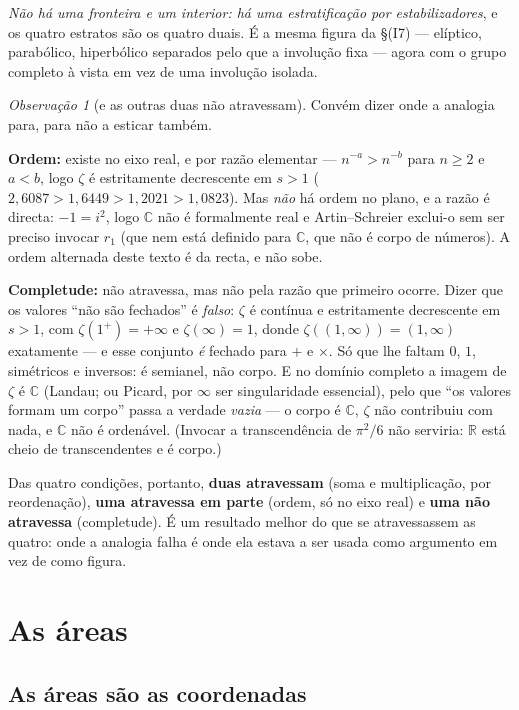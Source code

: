 \documentclass[11pt,a4paper]{article}
\theoremstyle{plain}
\theoremstyle{definition}
\theoremstyle{remark}
\newtheorem{obs}[teorema]{Observação}
\newcommand{\R}{\mathbb{R}}
\newcommand{\C}{\mathbb{C}}
\begin{document}
\noindent \emph{Não há uma fronteira e um interior: há uma estratificação por estabilizadores}, e
os quatro estratos são os quatro duais. É a mesma figura da \S(I7) --- elíptico,
parabólico, hiperbólico separados pelo que a involução fixa --- agora com o grupo completo à vista
em vez de uma involução isolada.

\begin{obs}[e as outras duas não atravessam]\label{obs:naoatravessa}
Convém dizer onde a analogia para, para não a esticar também.

\textbf{Ordem:} existe no eixo real, e por razão elementar --- $n^{-a}>n^{-b}$ para $n\geq2$ e
$a<b$, logo $\zeta$ é estritamente decrescente em $s>1$ ($2{,}6087 > 1{,}6449 > 1{,}2021 >
1{,}0823$). Mas \emph{não} há ordem no plano, e a razão é directa: $-1 = i^2$, logo $\C$ não é formalmente
real e Artin--Schreier exclui-o sem ser preciso invocar $r_1$ (que nem está definido para $\C$, que
não é corpo de números). A ordem alternada deste texto é da recta, e não sobe.

\textbf{Completude:} não atravessa, mas não pela razão que primeiro ocorre. Dizer que os valores
``não são fechados'' é \emph{falso}: $\zeta$ é contínua e estritamente decrescente em $s>1$, com
$\zeta(1^+)=+\infty$ e $\zeta(\infty)=1$, donde $\zeta((1,\infty)) = (1,\infty)$ exatamente --- e
esse conjunto \emph{é} fechado para $+$ e $\times$. Só que lhe faltam $0$, $1$, simétricos e
inversos: é semianel, não corpo. E no domínio completo a imagem de $\zeta$ é $\C$ (Landau; ou
Picard, por $\infty$ ser singularidade essencial), pelo que ``os valores formam um corpo'' passa a
verdade \emph{vazia} --- o corpo é $\C$, $\zeta$ não contribuiu com nada, e $\C$ não é ordenável.
(Invocar a transcendência de $\pi^2/6$ não serviria: $\R$ está cheio de transcendentes e é corpo.)

Das quatro condições, portanto, \textbf{duas atravessam} (soma e multiplicação, por reordenação),
\textbf{uma atravessa em parte} (ordem, só no eixo real) e \textbf{uma não atravessa}
(completude). É um resultado melhor do que se atravessassem as quatro: onde a analogia falha é
onde ela estava a ser usada como argumento em vez de como figura.
\end{obs}


\section{As áreas}\label{sec:areascap}

\subsection{As áreas são as coordenadas}\label{sec:areas}
\end{document}
